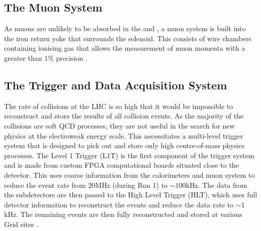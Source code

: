 \subsection{The Muon System} As muons are unlikely to be absorbed in
the \ECAL and \HCAL, a muon system is built into the iron return yoke
that surrounds the solenoid.  This consists of wire chambers
containing ionising gas that allows the measurement of muon momenta
with a greater than $1\%$ precision
\cite{CMS_Overview_Chatrchyan:2008aa}.

\subsection{The Trigger and Data Acquisition System}
\label{sec:triggers} The rate of collisions at the LHC is so high that
it would be impossible to reconstruct and store the results of all
collision events. As the majority of the collisions are soft QCD
processes, they are not useful in the search for new physics at the
electroweak energy scale. This necessitates a multi-level trigger
system that is designed to pick out and store only high centre-of-mass
physics processes. The Level 1 Trigger (L1T) is the first component of
the trigger system and is made from custom FPGA computational boards
situated close to the detector. This uses coarse information from the
calorimeters and muon system to reduce the event rate from $20$MHz
(during Run 1) to $\sim100$kHz. The data from the subdetectors are
then passed to the High Level Trigger (HLT), which uses full detector
information to reconstruct the events and reduce the data rate to
$\sim1$kHz. The remaining events are then fully reconstructed and
stored at various Grid sites \cite{GridTechDesign}.


